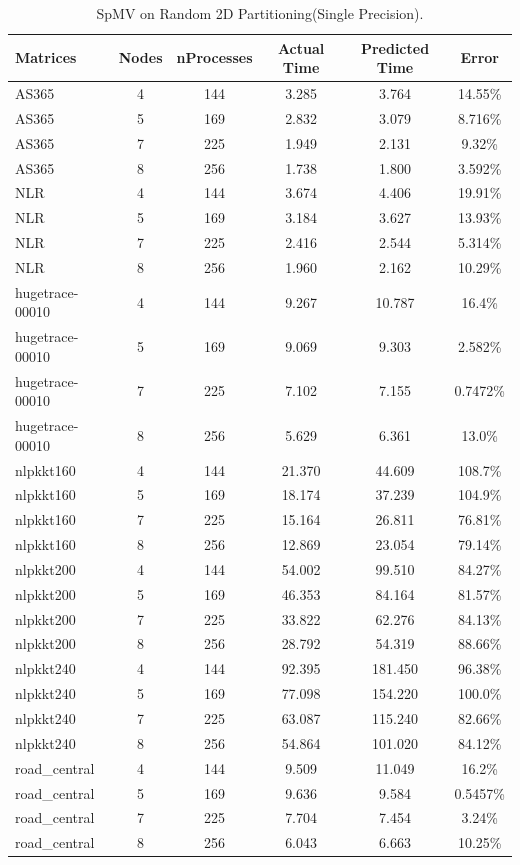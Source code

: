 \documentclass[conference, 10ppt]{IEEEtran}
\begin{document}
\begin{table}[htb]
\caption{SpMV on Random 2D Partitioning(Single Precision).}
\label{tab:spmv-2d-single}
\centering
\begin{tabular}[c]{| l | c | c | c | c | c |}
\hline
Matrices & Nodes & nProcesses & Actual Time & Predicted Time & Error \\ \hline

AS365 & 4 & 144 & 3.285 & 3.764 & 14.55\% \\ \hline
AS365 & 5 & 169 & 2.832 & 3.079 & 8.716\% \\ \hline
AS365 & 7 & 225 & 1.949 & 2.131 & 9.32\% \\ \hline
AS365 & 8 & 256 & 1.738 & 1.800 & 3.592\% \\ \hline
NLR & 4 & 144 & 3.674 & 4.406 & 19.91\% \\ \hline
NLR & 5 & 169 & 3.184 & 3.627 & 13.93\% \\ \hline
NLR & 7 & 225 & 2.416 & 2.544 & 5.314\% \\ \hline
NLR & 8 & 256 & 1.960 & 2.162 & 10.29\% \\ \hline
hugetrace-00010 & 4 & 144 & 9.267 & 10.787 & 16.4\% \\ \hline
hugetrace-00010 & 5 & 169 & 9.069 & 9.303 & 2.582\% \\ \hline
hugetrace-00010 & 7 & 225 & 7.102 & 7.155 & 0.7472\% \\ \hline
hugetrace-00010 & 8 & 256 & 5.629 & 6.361 & 13.0\% \\ \hline
nlpkkt160 & 4 & 144 & 21.370 & 44.609 & 108.7\% \\ \hline
nlpkkt160 & 5 & 169 & 18.174 & 37.239 & 104.9\% \\ \hline
nlpkkt160 & 7 & 225 & 15.164 & 26.811 & 76.81\% \\ \hline
nlpkkt160 & 8 & 256 & 12.869 & 23.054 & 79.14\% \\ \hline
nlpkkt200 & 4 & 144 & 54.002 & 99.510 & 84.27\% \\ \hline
nlpkkt200 & 5 & 169 & 46.353 & 84.164 & 81.57\% \\ \hline
nlpkkt200 & 7 & 225 & 33.822 & 62.276 & 84.13\% \\ \hline
nlpkkt200 & 8 & 256 & 28.792 & 54.319 & 88.66\% \\ \hline
nlpkkt240 & 4 & 144 & 92.395 & 181.450 & 96.38\% \\ \hline
nlpkkt240 & 5 & 169 & 77.098 & 154.220 & 100.0\% \\ \hline
nlpkkt240 & 7 & 225 & 63.087 & 115.240 & 82.66\% \\ \hline
nlpkkt240 & 8 & 256 & 54.864 & 101.020 & 84.12\% \\ \hline
road\_central & 4 & 144 & 9.509 & 11.049 & 16.2\% \\ \hline
road\_central & 5 & 169 & 9.636 & 9.584 & 0.5457\% \\ \hline
road\_central & 7 & 225 & 7.704 & 7.454 & 3.24\% \\ \hline
road\_central & 8 & 256 & 6.043 & 6.663 & 10.25\% \\ \hline



\end{tabular}
\end{table}
\end{document}
